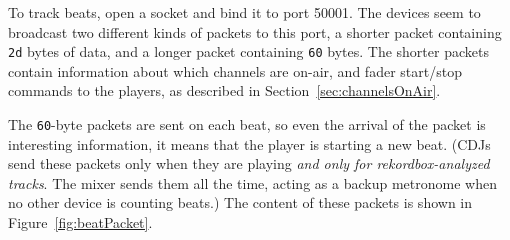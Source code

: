 \documentclass[11pt]{article}
\begin{document}
To track beats, open a socket and bind it to port 50001. The devices
seem to broadcast two different kinds of packets to this port, a
shorter packet containing {\tt 2d} bytes of data, and a longer packet
containing {\tt 60} bytes. The shorter packets contain information
about which channels are on-air, and fader start/stop commands to the
players, as described in Section~\ref{sec:channelsOnAir}.

The {\tt 60}-byte packets are sent on each beat, so even the arrival
of the packet is interesting information, it means that the player is
starting a new beat. (CDJs send these packets only when they are
playing \emph{and only for rekordbox-analyzed tracks}. The mixer sends
them all the time, acting as a backup metronome when no other device
is counting beats.) The content of these packets is shown in
Figure~\ref{fig:beatPacket}.
\end{document}

